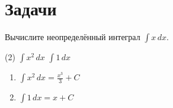 \documentclass[assessment, recordsfile=records.lua]{practice}
\begin{document}
\section*{Задачи}

\begin{exercise}
	Вычислите неопределённый интеграл $\int x \, dx$.
\end{exercise}

\begin{tasks}(2)
	\task $\int x^2 \, dx$
	\task $\int 1 \, dx$
\end{tasks}

\begin{solution}
	\begin{enumerate}
		\item $\int x^2 \, dx = \frac{x^3}{3} + C$
		\item $\int 1 \, dx = x + C$
	\end{enumerate}
\end{solution}
\end{document}
